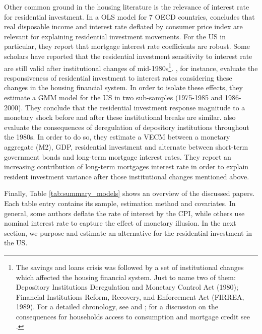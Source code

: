 \documentclass[12pt, a4paper]{article}
\begin{document}
Other common ground in the housing literature is the relevance of interest rate for residential investment.
In a OLS model for 7 OECD countries, \textcite{egebo_1990_MODEL} concludes that real disposable income and interest rate deflated by consumer price index are relevant for explaining residential investment movements.
For the US in particular, they report that mortgage interest rate coefficients are robust.
Some scholars have reported that the residential investment sensitivity to interest rate are still valid after institutional changes of mid-1980s\footnote{The savings and loans crisis was followed by a set of institutional changes which affected the housing financial system. Just to name two of them: Depository Institutions Deregulation and Monetary Control Act (1980); Financial Institutions Reform, Recovery, and Enforcement Act (FIRREA, 1989). For a detailed chronology, see  \textcite[Appendix B]{mccarthyMonetaryPolicyTransmission2002} and \textcite{green_american_2005}; for a discussion on the consequences for households access to consumption and mortgage credit see \textcite{federal_deposit_insurance_corporation_savings_1997,wall_too_2010}.}.
\textcite{mccarthyMonetaryPolicyTransmission2002}, for instance, evaluate the responsiveness of residential investment to interest rates considering these changes in the housing financial system.
In order to isolate these effects, they estimate  a GMM model for the US in two sub-samples (1975-1985 and 1986-2000).
They conclude that the residential investment response magnitude to a monetary shock before and after these institutional breaks are similar.
\textcite{gauger_residential_2003} also evaluate the consequences of deregulation of depository institutions throughout the 1980s.
In order to do so, they estimate a VECM between a monetary aggregate (M2), GDP, residential investment and alternate between short-term government bonds and long-term mortgage interest rates.
They report an increasing contribution of long-term mortgages interest rate in order to explain resident investment variance after those institutional changes mentioned above.


Finally, Table \ref{tab:summary_models} shows an overview of the discussed papers.
Each table entry contains its sample, estimation method and covariates.
In general, some authors deflate the rate of interest by the CPI, while others use nominal interest rate to capture the effect of monetary illusion.
In the next section, we purpose and estimate an alternative for the residential investment in the US.
\end{document}
